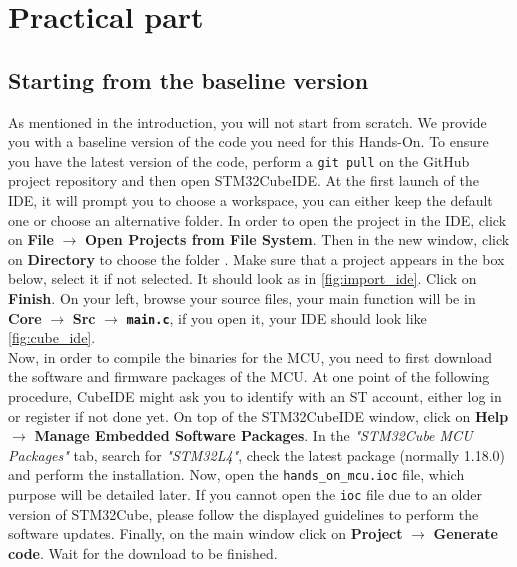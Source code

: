 \section{Practical part}

\subsection{Starting from the baseline version}

As mentioned in the introduction, you will not start from scratch. We provide you with a  baseline version of the code you need for this Hands-On. To ensure you have the latest version of the code, perform a \texttt{git pull} on the GitHub project repository and then open STM32CubeIDE. At the first launch of the IDE, it will prompt you to choose a workspace, you can either keep the default one or choose an alternative folder. In order to open the project in the IDE, click on \textbf{File} $\rightarrow$ \textbf{Open Projects from File System}. Then in the new window, click on \textbf{Directory} to choose the  folder . Make sure that a project appears in the box below, select it if not selected. It should look as in \autoref{fig:import_ide}. Click on \textbf{Finish}. On your left, browse your source files, your main function will be in \textbf{Core} $\rightarrow$ \textbf{Src} $\rightarrow$ \texttt{\textbf{main.c}}, if you open it, your IDE should look like \autoref{fig:cube_ide}. \\


Now, in order to compile the binaries for the MCU, you need to first download the software and firmware packages of the MCU. At one point of the following procedure, CubeIDE might ask you to identify with an ST account, either log in or register if not done yet. On top of the STM32CubeIDE window, click on \textbf{Help}$\rightarrow$ \textbf{Manage Embedded Software Packages}. In the \textit{"STM32Cube MCU Packages"} tab, search for \textit{"STM32L4"}, check the latest package (normally 1.18.0) and perform the installation.  Now, open the \texttt{hands\_on\_mcu.ioc} file, which purpose will be detailed later. If you cannot open the \texttt{ioc} file due to an older version of STM32Cube, please follow the displayed guidelines to perform the software updates. Finally, on the main window click on \textbf{Project} $\rightarrow$ \textbf{Generate code}. Wait for the download to be finished.


